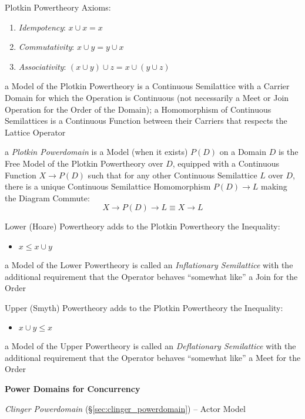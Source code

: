 Plotkin Powertheory Axioms:
\begin{enumerate}
  \item \emph{Idempotency}: $x \cup x = x$
  \item \emph{Commutativity}: $x \cup y = y \cup x$
  \item \emph{Associativity}: $(x \cup y) \cup z = x \cup (y \cup z)$
\end{enumerate}
a Model of the Plotkin Powertheory is a Continuous Semilattice with a
Carrier Domain for which the Operation is Continuous (not necessarily
a Meet or Join Operation for the Order of the Domain); a Homomorphism
of Continuous Semilattices is a Continuous Function between their
Carriers that respects the Lattice Operator

a \emph{Plotkin Powerdomain} is a Model (when it exists) $P(D)$ on a
Domain $D$ is the Free Model of the Plotkin Powertheory over $D$,
equipped with a Continuous Function $X \rightarrow P(D)$ such that for
any other Continuous Semilattice $L$ over $D$, there is a unique
Continuous Semilattice Homomorphism $P(D) \rightarrow L$ making the
Diagram Commute:
\[
  X \rightarrow P(D) \rightarrow L \equiv X \rightarrow L
\]

Lower (Hoare) Powertheory adds to the Plotkin Powertheory the
Inequality:
\begin{itemize}
  \item $x \leq x \cup y$
\end{itemize}
a Model of the Lower Powertheory is called an \emph{Inflationary
  Semilattice} with the additional requirement that the Operator
behaves ``somewhat like'' a Join for the Order %

Upper (Smyth) Powertheory adds to the Plotkin Powertheory the
Inequality:
\begin{itemize}
  \item $x \cup y \leq x$
\end{itemize}
a Model of the Upper Powertheory is called an \emph{Deflationary
  Semilattice} with the additional requirement that the Operator
behaves ``somewhat like'' a Meet for the Order %


\textbf{Power Domains for Concurrency}

\emph{Clinger Powerdomain} (\S\ref{sec:clinger_powerdomain}) -- Actor
Model

